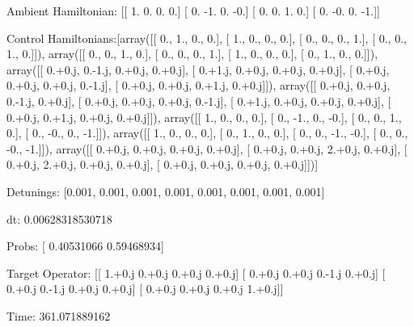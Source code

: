 \documentclass{article}
\begin{document}
    

\newpage

Ambient Hamiltonian: [[ 1.  0.  0.  0.]
 [ 0. -1.  0. -0.]
 [ 0.  0.  1.  0.]
 [ 0. -0.  0. -1.]]

Control Hamiltonians:[array([[ 0.,  1.,  0.,  0.],
       [ 1.,  0.,  0.,  0.],
       [ 0.,  0.,  0.,  1.],
       [ 0.,  0.,  1.,  0.]]), array([[ 0.,  0.,  1.,  0.],
       [ 0.,  0.,  0.,  1.],
       [ 1.,  0.,  0.,  0.],
       [ 0.,  1.,  0.,  0.]]), array([[ 0.+0.j,  0.-1.j,  0.+0.j,  0.+0.j],
       [ 0.+1.j,  0.+0.j,  0.+0.j,  0.+0.j],
       [ 0.+0.j,  0.+0.j,  0.+0.j,  0.-1.j],
       [ 0.+0.j,  0.+0.j,  0.+1.j,  0.+0.j]]), array([[ 0.+0.j,  0.+0.j,  0.-1.j,  0.+0.j],
       [ 0.+0.j,  0.+0.j,  0.+0.j,  0.-1.j],
       [ 0.+1.j,  0.+0.j,  0.+0.j,  0.+0.j],
       [ 0.+0.j,  0.+1.j,  0.+0.j,  0.+0.j]]), array([[ 1.,  0.,  0.,  0.],
       [ 0., -1.,  0., -0.],
       [ 0.,  0.,  1.,  0.],
       [ 0., -0.,  0., -1.]]), array([[ 1.,  0.,  0.,  0.],
       [ 0.,  1.,  0.,  0.],
       [ 0.,  0., -1., -0.],
       [ 0.,  0., -0., -1.]]), array([[ 0.+0.j,  0.+0.j,  0.+0.j,  0.+0.j],
       [ 0.+0.j,  0.+0.j,  2.+0.j,  0.+0.j],
       [ 0.+0.j,  2.+0.j,  0.+0.j,  0.+0.j],
       [ 0.+0.j,  0.+0.j,  0.+0.j,  0.+0.j]])]

Detunings: [0.001, 0.001, 0.001, 0.001, 0.001, 0.001, 0.001, 0.001]

 dt: 0.00628318530718

Probs: [ 0.40531066  0.59468934]

Target Operator: [[ 1.+0.j  0.+0.j  0.+0.j  0.+0.j]
 [ 0.+0.j  0.+0.j  0.-1.j  0.+0.j]
 [ 0.+0.j  0.-1.j  0.+0.j  0.+0.j]
 [ 0.+0.j  0.+0.j  0.+0.j  1.+0.j]]

Time: 361.071889162
\end{document}
